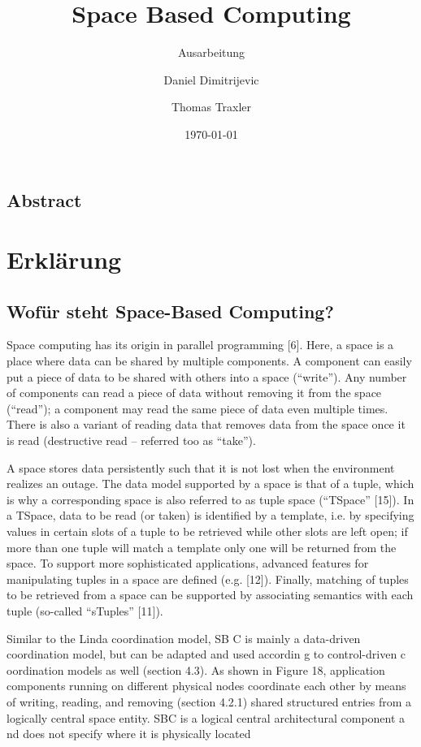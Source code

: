 \documentclass[a4paper,12pt]{scrreprt}
\begin{document}
\author{Daniel Dimitrijevic \and Thomas Traxler} %
\title{ Space Based Computing } %
\subject{VSDB} %
\subtitle{ Ausarbeitung } %
\date{\today} %
\publishers{5AHITT} %

\maketitle
\tableofcontents

\section{Abstract}
	
\chapter{Erklärung}
	\section{Wofür steht Space-Based Computing?}
		Space computing has its origin in parallel programming [6]. Here, a space is a place where data can be shared by multiple components. A component can easily put a piece of data to be shared with others into a space (“write”). Any number of components can read a piece of data without removing it from the space (“read”); a component may read the same piece of data even multiple times.	There is also a variant of reading data that removes data from the space once it is read (destructive read – referred too as “take”). 
		
		A space stores data persistently such that it is not lost when the environment
		realizes an outage. The data model supported by a space is that of a tuple, which
		is why a corresponding space is also referred to as tuple space (“TSpace” [15]).
		In a TSpace, data to be read (or taken) is identified by a template, i.e. by
		specifying values in certain slots of a
		tuple to be retrieved while other slots are
		left open; if more than one tuple will match a template only one will be returned
		from the space. To support more sophisticated applications, advanced features
		for manipulating tuples in a space are defined (e.g. [12]). Finally, matching of
		tuples to be retrieved from a space can be supported by associating semantics
		with each tuple (so-called “sTuples” [11]). 
		
		
		
		
		Similar to the Linda coordination model, SB
		C is mainly a data-driven coordination
		model, but can be adapted and used accordin
		g to control-driven c
		oordination models as
		well (section 4.3). As shown in Figure 18,
		application components running on different
		physical nodes coordinate each other by
		means of writing, reading, and removing
		(section 4.2.1) shared structured entries from a logically central space entity. SBC is a
		logical central architectural component a
		nd does not specify where it is physically
		located
		
\end{document}
